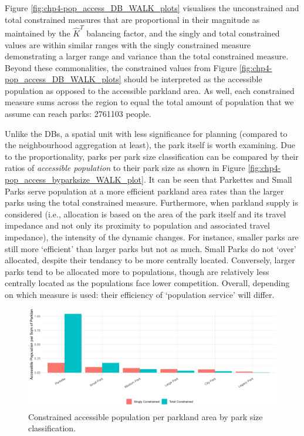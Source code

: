 \documentclass[
11pt, %
oneside, %
english, %
singlespacing, %
]{macthesis} %
\begin{document}
Figure \ref{fig:chp4-pop_access_DB_WALK_plots} visualises the unconstrained and total constrained measures that are proportional in their magnitude as maintained by the \(\hat K^T\) balancing factor, and the singly and total constrained values are within similar ranges with the singly constrained measure demonstrating a larger range and variance than the total constrained measure. Beyond these commonalities, the constrained values from Figure \ref{fig:chp4-pop_access_DB_WALK_plots} should be interpreted as the accessible population as opposed to the accessible parkland area. As well, each constrained measure sums across the region to equal the total amount of population that we assume can reach parks: 2761103 people.

Unlike the DBs, a spatial unit with less significance for planning (compared to the neighbourhood aggregation at least), the park itself is worth examining. Due to the proportionality, parks per park size classification can be compared by their ratios of \emph{accessible population} to their park size as shown in Figure \ref{fig:chp4-pop_access_byparksize_WALK_plot}. It can be seen that Parkettes and Small Parks serve population at a more efficient parkland area rates than the larger parks using the total constrained measure. Furthermore, when parkland supply is considered (i.e., allocation is based on the area of the park itself and its travel impedance and not only its proximity to population and associated travel impedance), the intensity of the dynamic changes. For instance, smaller parks are still more `efficient' than larger parks but not as much. Small Parks do not `over' allocated, despite their tendancy to be more centrally located. Conversely, larger parks tend to be allocated more to populations, though are relatively less centrally located as the populations face lower competition. Overall, depending on which measure is used: their efficiency of `population service' will differ.

\begin{figure}

{\centering \includegraphics[width=6in]{./data/figures/chp4-pop_access_byparksize_WALK_plot} 

}

\caption{\label{fig:chp4-pop_access_byparksize_WALK_plot}Constrained accessible population per parkland area by park size classification.}\label{fig:unnamed-chunk-67}
\end{figure}
\end{document}
